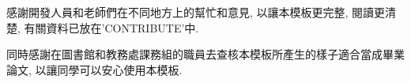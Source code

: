 \StartAcknowledgments

感謝開發人員和老師們在不同地方上的幫忙和意見, 以讓本模板更完整, 閱讀更清楚, 有關資料已放在'CONTRIBUTE'中.

同時感謝在圖書館和教務處課務組的職員去查核本模板所產生的樣子適合當成畢業論文, 以讓同學可以安心使用本模板.

\EndAcknowledgments

